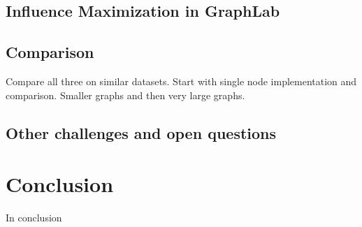 \documentclass[english]{tktltiki}
\begin{document}
\subsection{Influence Maximization in GraphLab}

\subsection{Comparison}
Compare all three on similar datasets. Start with single node implementation and comparison. Smaller graphs and then very large graphs.



\subsection{Other challenges and open questions}



\section{Conclusion}
In conclusion
\pagebreak







\lastpage

\appendices

\pagestyle{empty}
\end{document}
